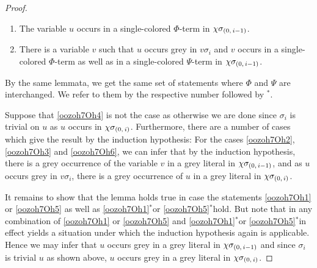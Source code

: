 \documentclass[,%
	draft=false,%
	numbers=noendperiod
	12pt,
	a4paper,
	oneside,%
	openany,
]{memoir}
\begin{document}
\begin{proof}
\begin{enumerate}
		\item
			\label{oozoh7Oh5}
			The variable $u$ occurs in a single-colored $\Phi$-term in $\chi\sigma_{(0,\,i-1)}$.

		\item
			\label{oozoh7Oh6}
			There is a variable $v$ such that $u$ occurs grey in $v\sigma_i$ and $v$ occurs in a single-colored $\Phi$-term as well as in a single-colored $\Psi$-term in $\chi\sigma_{(0,\,i-1)}$.


	\end{enumerate}

	\newcommand{\othercase}{$^*$}

	By the same lemmata, we get the same set of statements where $\Phi$ and $\Psi$ are interchanged. We refer to them by the respective number followed by \othercase.

	Suppose that \ref{oozoh7Oh4} is not the case as otherwise we are done since $\sigma_i$ is trivial on $u$ as $u$ occurs in $\chi\sigma_{(0,\,i)}$.
	Furthermore, there are a number of cases which give the result by the induction hypothesis:
	For the cases \ref{oozoh7Oh2}, \ref{oozoh7Oh3} and \ref{oozoh7Oh6}, we can infer that by the induction hypothesis, there is a grey occurrence of the variable $v$ in a grey literal in $\chi\sigma_{(0,\,i-1)}$, and as $u$ occurs grey in $v\sigma_i$, there is a grey occurrence of $u$ in a grey literal in $\chi\sigma_{(0,\,i)}$.

	It remains to show that the lemma holds true in case the statements \ref{oozoh7Oh1} or \ref{oozoh7Oh5} as well as \ref{oozoh7Oh1}\othercase or \ref{oozoh7Oh5}\othercase hold.
	But note that in any combination of \ref{oozoh7Oh1} or \ref{oozoh7Oh5} and \ref{oozoh7Oh1}\othercase or \ref{oozoh7Oh5}\othercase in effect yields a situation under which the induction hypothesis again is applicable.
	Hence we may infer that $u$ occurs grey in a grey literal in $\chi\sigma_{(0,\,i-1)}$ and since $\sigma_i$ is trivial $u$ as shown above, $u$ occurs grey in a grey literal in $\chi\sigma_{(0,\,i)}$.
\end{proof}
\end{document}
